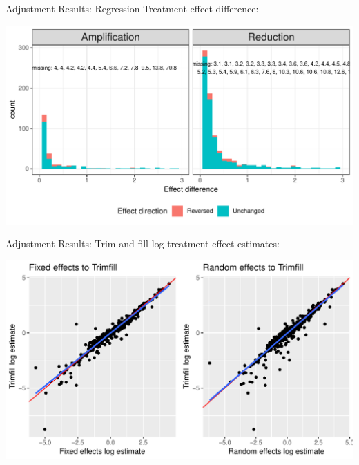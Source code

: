 \documentclass[english]{beamer}\usepackage[]{graphicx}\usepackage[]{color}
\makeatletter
\def\maxwidth{ %
  \ifdim\Gin@nat@width>\linewidth
    \linewidth
  \else
    \Gin@nat@width
  \fi
}
\newenvironment{knitrout}{}{} %
\makeatother
\begin{document}
\begin{frame}[fragile]{Adjustment Results: Regression}
Treatment effect difference:

\vspace{-3mm}
\begin{knitrout}
\color{fgcolor}
\includegraphics[width=\maxwidth]{figure/unnamed-chunk-20-1} 

\end{knitrout}
\end{frame}



\begin{frame}[fragile]{Adjustment Results: Trim-and-fill}
log treatment effect estimates:

\vspace{-3mm}
\begin{knitrout}
\color{fgcolor}
\includegraphics[width=\maxwidth]{figure/unnamed-chunk-21-1} 

\end{knitrout}
\end{frame}
\end{document}
